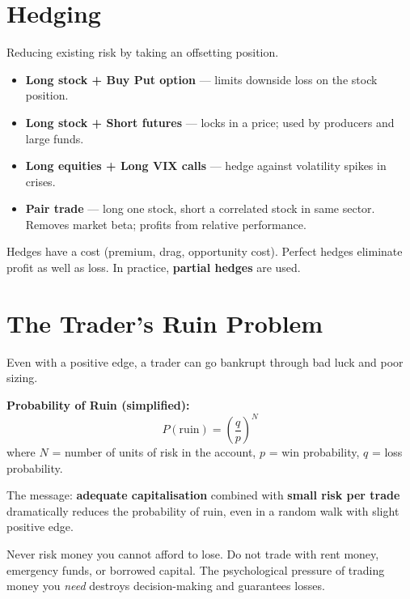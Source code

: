 \section{Hedging}

Reducing existing risk by taking an offsetting position.

\begin{itemize}
  \item \textbf{Long stock + Buy Put option} — limits downside loss on the stock position.
  \item \textbf{Long stock + Short futures} — locks in a price; used by producers and large funds.
  \item \textbf{Long equities + Long VIX calls} — hedge against volatility spikes in crises.
  \item \textbf{Pair trade} — long one stock, short a correlated stock in same sector.
        Removes market beta; profits from relative performance.
\end{itemize}

Hedges have a cost (premium, drag, opportunity cost). Perfect hedges eliminate profit
as well as loss. In practice, \textbf{partial hedges} are used.

\section{The Trader's Ruin Problem}

Even with a positive edge, a trader can go bankrupt through bad luck and poor sizing.

\begin{formulabox}
\textbf{Probability of Ruin (simplified):}
\[
  P(\text{ruin}) = \left(\frac{q}{p}\right)^N
\]
where $N$ = number of units of risk in the account, $p$ = win probability, $q$ = loss probability.
\end{formulabox}

The message: \textbf{adequate capitalisation} combined with \textbf{small risk per trade}
dramatically reduces the probability of ruin, even in a random walk with slight positive edge.

\begin{warningbox}
Never risk money you cannot afford to lose. Do not trade with rent money, emergency funds,
or borrowed capital. The psychological pressure of trading money you \emph{need} destroys
decision-making and guarantees losses.
\end{warningbox}
